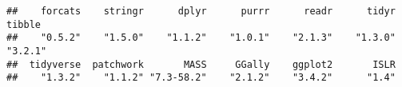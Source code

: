 \documentclass[
]{article}
\newenvironment{Shaded}{\begin{snugshade}}{\end{snugshade}}
\newcommand{\FunctionTok}[1]{\textcolor[rgb]{0.13,0.29,0.53}{\textbf{#1}}}
\newcommand{\NormalTok}[1]{#1}
\newcommand{\SpecialCharTok}[1]{\textcolor[rgb]{0.81,0.36,0.00}{\textbf{#1}}}
\newcommand{\StringTok}[1]{\textcolor[rgb]{0.31,0.60,0.02}{#1}}
\begin{document}
\begin{Shaded}
\end{Shaded}

\begin{verbatim}
##    forcats    stringr      dplyr      purrr      readr      tidyr     tibble 
##    "0.5.2"    "1.5.0"    "1.1.2"    "1.0.1"    "2.1.3"    "1.3.0"    "3.2.1" 
##  tidyverse  patchwork       MASS     GGally    ggplot2       ISLR 
##    "1.3.2"    "1.1.2" "7.3-58.2"    "2.1.2"    "3.4.2"      "1.4"
\end{verbatim}
\end{document}
